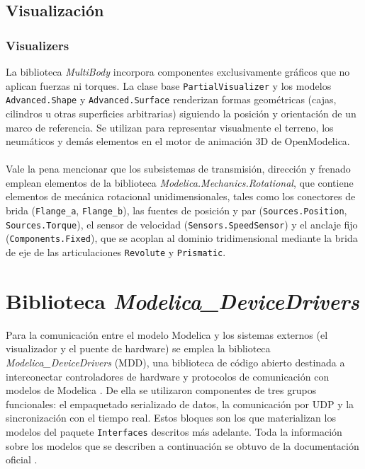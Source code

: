 \subsection*{Visualización}


\subsubsection{Visualizers}
La biblioteca \textit{MultiBody} incorpora componentes exclusivamente gráficos que no aplican fuerzas ni torques. La clase base \verb|PartialVisualizer| y los modelos \verb|Advanced.Shape| y \verb|Advanced.Surface| renderizan formas geométricas (cajas, cilindros u otras superficies arbitrarias) siguiendo la posición y orientación de un marco de referencia. Se utilizan para representar visualmente el terreno, los neumáticos y demás elementos en el motor de animación 3D de OpenModelica.\\\\

Vale la pena mencionar que los subsistemas de transmisión, dirección y frenado emplean elementos de la biblioteca \textit{Modelica.Mechanics.Rotational}, que contiene elementos de mecánica rotacional unidimensionales, tales como los conectores de brida (\verb|Flange_a|, \verb|Flange_b|), las fuentes de posición y par (\verb|Sources.Position|, \verb|Sources.Torque|), el sensor de velocidad (\verb|Sensors.SpeedSensor|) y el anclaje fijo (\verb|Components.Fixed|), que se acoplan al dominio tridimensional mediante la brida de eje de las articulaciones \verb|Revolute| y \verb|Prismatic|.

\section{Biblioteca \textit{Modelica\_DeviceDrivers}}

Para la comunicación entre el modelo Modelica y los sistemas externos (el visualizador y el puente de hardware) se emplea la biblioteca \textit{Modelica\_DeviceDrivers} (MDD), una biblioteca de código abierto destinada a interconectar controladores de hardware y protocolos de comunicación con modelos de Modelica \cite{mdd}. De ella se utilizaron componentes de tres grupos funcionales: el empaquetado serializado de datos, la comunicación por UDP y la sincronización con el tiempo real. Estos bloques son los que materializan los modelos del paquete \verb|Interfaces| descritos más adelante. Toda la información sobre los modelos que se describen a continuación se obtuvo de la documentación oficial \cite{mdd_docs}.

